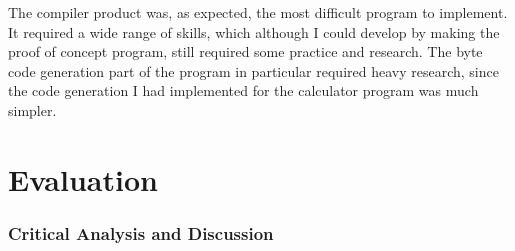 \documentclass[a4paper, 11pt]{article}
\begin{document}
The compiler product was, as expected, the most difficult program to implement. It required a wide range of skills, which although I could develop by making the proof of concept program, still required some practice and research. The byte code generation part of the program in particular required heavy research, since the code generation I had implemented for the calculator program was much simpler.


\newpage\part{Evaluation}

\section{Critical Analysis and Discussion}
\end{document}

